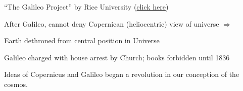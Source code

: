 \documentclass{article}
\begin{document}
 ``The Galileo Project'' by Rice University (\href{http://galileo.rice.edu/}{click here})

After Galileo, cannot deny Copernican (heliocentric) view of universe $\Rightarrow$ 

Earth dethroned from central position in Universe

Galileo charged with house arrest by Church; books forbidden until 1836

Ideas of Copernicus and Galileo began a revolution in our conception of the cosmos.

\clearpage


\printnoidxglossaries
\end{document}
